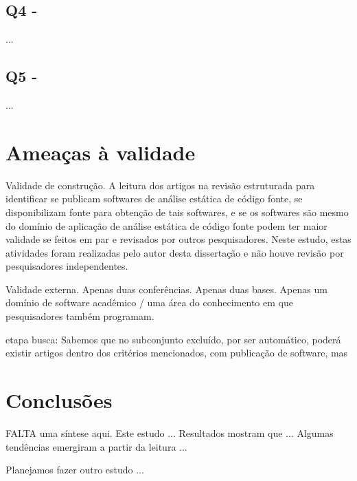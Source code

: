 \subsection{Q4 - \EstudoUmQuestaoQuatro}

...

\subsection{Q5 - \EstudoUmQuestaoCinco}

...

\section{Ameaças à validade}

Validade de construção.
A leitura dos artigos na revisão estruturada para identificar se publicam
softwares de análise estática de código fonte, se disponibilizam fonte para
obtenção de tais softwares, e se os softwares são mesmo do domínio de aplicação
de análise estática de código fonte podem ter maior validade se feitos em
par e revisados por outros pesquisadores.
Neste estudo, estas atividades foram realizadas pelo autor desta dissertação e 
não houve revisão por pesquisadores independentes.

Validade externa. Apenas duas conferências. Apenas duas bases. Apenas um domínio de software acadêmico / uma área do conhecimento em que pesquisadores também programam.

etapa busca: Sabemos que no subconjunto excluído, por ser automático, poderá existir artigos
dentro dos critérios mencionados, com publicação de software, mas 

\section{Conclusões} \label{estudo1:conclusoes}

FALTA uma síntese aqui. 
Este estudo ...
Resultados mostram que ...
Algumas tendências emergiram a partir da leitura ...

Planejamos fazer outro estudo ... 


